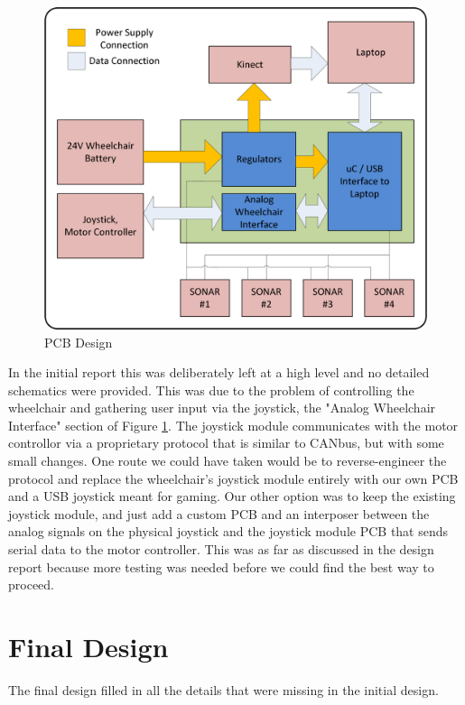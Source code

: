 \documentclass[oneside,final,a4paper]{report}
\begin{document}
\begin{figure}[hbt]
 \centering
 \includegraphics[scale=0.5]{FYDP_PCB_Diagram}
 \caption{PCB Design}\label{fig:hardware_diag}
\end{figure}

In the initial report this was deliberately left at a high level and no detailed schematics were provided. This was due to the problem of controlling the wheelchair and gathering user input via the joystick, the "Analog Wheelchair Interface" section of Figure \ref{fig:hardware_diag}. The joystick module communicates with the motor controllor via a proprietary protocol that is similar to CANbus, but with some small changes. One route we could have taken would be to reverse-engineer the protocol and replace the wheelchair's joystick module entirely with our own PCB and a USB joystick meant for gaming. Our other option was to keep the existing joystick module, and just add a custom PCB and an interposer between the analog signals on the physical joystick and the joystick module PCB that sends serial data to the motor controller. This was as far as discussed in the design report because more testing was needed before we could find the best way to proceed.

\section{Final Design}
The final design filled in all the details that were missing in the initial design. 
\end{document}
